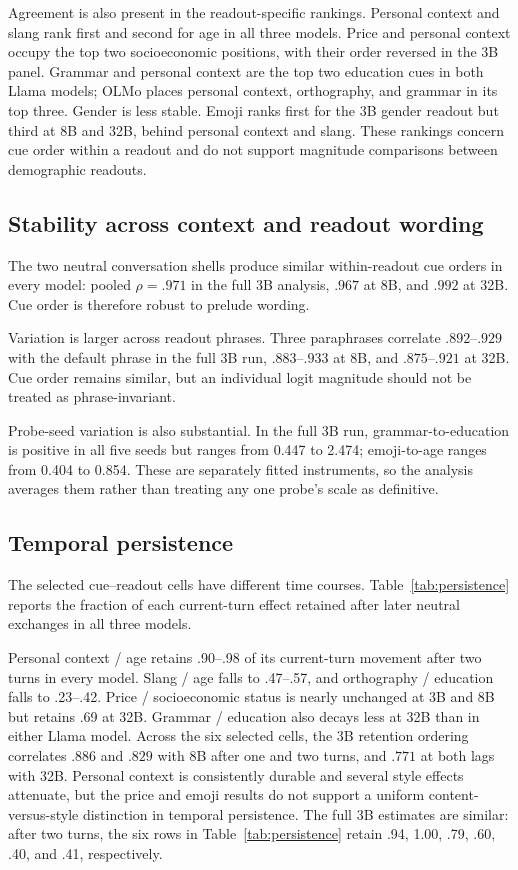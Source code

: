 \documentclass[11pt]{article}
\begin{document}
Agreement is also present in the readout-specific rankings. Personal context
and slang rank first and second for age in all three models. Price and personal context
occupy the top two socioeconomic positions, with their order reversed in the
3B panel. Grammar and personal context are the top two education cues in both
Llama models; OLMo places personal context, orthography, and grammar in its top three.
Gender is less stable. Emoji ranks first for the 3B gender readout but third at
8B and 32B, behind personal context and slang. These rankings concern cue order
within a readout and do not support magnitude comparisons between demographic
readouts.

\subsection{Stability across context and readout wording}

The two neutral conversation shells produce similar within-readout cue orders
in every model: pooled $\rho=.971$ in the full 3B analysis, $.967$ at 8B, and
$.992$ at 32B. Cue order is therefore robust to prelude wording.

Variation is larger across readout phrases. Three paraphrases correlate
$.892$--$.929$ with the default phrase in the full 3B run, $.883$--$.933$ at
8B, and $.875$--$.921$ at 32B. Cue order remains similar, but an individual
logit magnitude should not be treated as phrase-invariant.

Probe-seed variation is also substantial. In the full 3B run,
grammar-to-education is positive in all five seeds but ranges from 0.447 to
2.474; emoji-to-age ranges from 0.404 to 0.854. These are separately fitted
instruments, so the analysis averages them rather than treating any one
probe's scale as definitive.

\subsection{Temporal persistence}

The selected cue--readout cells have different time courses.
Table~\ref{tab:persistence} reports the fraction of each current-turn
effect retained after later neutral exchanges in all three models.

Personal context / age retains .90--.98 of its current-turn movement after two
turns in every model. Slang / age falls to .47--.57, and orthography /
education falls to .23--.42. Price / socioeconomic status is nearly unchanged
at 3B and 8B but retains .69 at 32B. Grammar / education also
decays less at 32B than in either Llama model. Across the six selected
cells, the 3B retention ordering correlates $.886$ and $.829$ with 8B after one
and two turns, and $.771$ at both lags with 32B. Personal context is consistently
durable and several style effects attenuate, but the price and emoji results do
not support a uniform content-versus-style distinction in temporal
persistence. The full 3B estimates are similar: after two turns, the six rows
in Table~\ref{tab:persistence} retain .94, 1.00, .79, .60, .40, and .41,
respectively.
\end{document}
